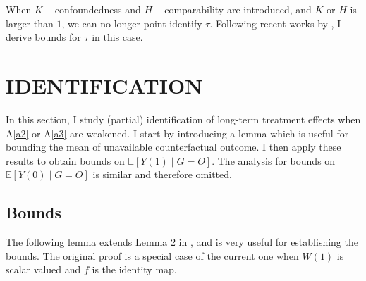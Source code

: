\documentclass[12pt]{article}
\newcommand{\Ep}{\mathbb{E}}
\begin{document}
	When $K-$confoundedness and $H-$comparability are introduced, and $K$ or $H$ is larger than $1$, we can no longer point identify $\tau$. Following recent works by \textcite{rosenbaum2002overt, masten2018identification,yadlowsky2018bounds}, I derive bounds for $\tau$ in this case.
	
	\section{IDENTIFICATION}
	
	In this section, I study (partial) identification of long-term treatment effects when A\ref{a2} or A\ref{a3} are weakened. I start by introducing a lemma which is useful for bounding the mean of unavailable counterfactual outcome. I then apply these results to obtain bounds on $\Ep[Y(1) \mid G = O]$. The analysis for bounds on $\Ep[Y(0) \mid G = O]$ is similar and therefore omitted.
	
	\subsection{Bounds}
	
	The following lemma extends Lemma 2 in \textcite{yadlowsky2018bounds}, and is very useful for establishing the bounds. The original proof is a special case of the current one when $W(1)$ is scalar valued and $f$ is the identity map.
	
\end{document}
